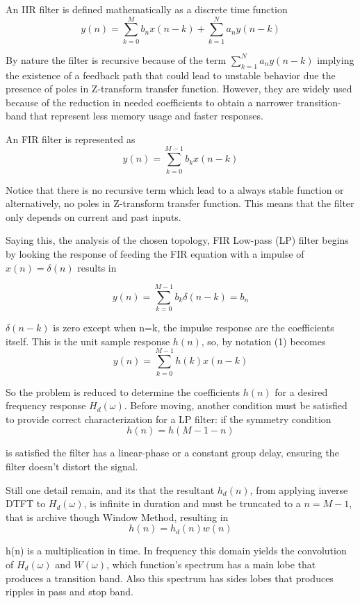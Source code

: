 \documentclass[12 pt]{article}
\begin{document}
	An IIR filter is defined mathematically as a discrete time function  
	\[y(n) = \sum_{k=0}^{M} b_n x(n-k) + \sum_{k=1}^{N} a_n y(n-k)\] 
	
	By nature the filter is recursive because of the term  $\sum_{k=1}^{N} a_n y(n-k)$ implying the existence of a feedback path that could lead to unstable behavior due the presence of poles in Z-transform transfer function. However, they are widely used because of the reduction in needed coefficients to obtain a narrower transition-band that represent less memory usage and faster responses. 
	  
	An FIR filter is represented as 
	\begin{equation}
		y(n) = \sum_{k=0}^{M-1} b_k x(n-k) 
	\end{equation}
	
	Notice that there is no recursive term which lead to a always stable function or alternatively, no poles in Z-transform transfer function. This means that the filter only depends on current and past inputs. 
	
	Saying this, the analysis of the chosen topology, FIR Low-pass (LP) filter begins by looking the response of feeding the FIR equation with a impulse of $x(n) = \delta(n)$ results in  
	
	\[ y(n) = \sum_{k=0}^{M-1} b_k \delta(n-k) = b_n\]
	
	 $\delta(n-k)$ is zero except when n=k, the impulse response are the coefficients itself. This is the unit sample response $h(n)$, so, by notation (1) becomes
	 \begin{equation}
	 	y(n) = \sum_{k=0}^{M-1} h(k) x(n-k) 
	 \end{equation}
	
	So the problem is reduced to determine the coefficients $h(n)$ for a desired frequency response $H_d(\omega)$. Before moving, another condition must be satisfied to provide correct characterization for a LP filter: if the symmetry condition 
	\[h(n) = h(M-1-n) \]
	
	 is satisfied the filter has a linear-phase or a constant group delay, ensuring the filter doesn't distort the signal.
	 
	 Still one detail remain, and its that the resultant $h_d(n)$, from applying inverse DTFT to $H_d(\omega)$, is infinite in duration and must be truncated to a $n=M-1$, that is archive though Window Method, resulting in
	 \[h(n) = h_d(n) w(n) \] 
	 
	 h(n) is a multiplication in time. In frequency this domain yields the convolution of $H_d(\omega)$ and $W(\omega)$, which function's spectrum has a main lobe that produces a transition band. Also this spectrum has sides lobes that produces ripples in pass and stop band. 
	
\end{document}
